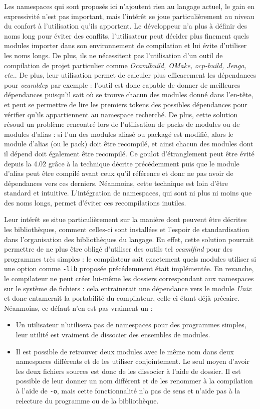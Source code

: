\documentclass[11pt,a4paper]{report}
\begin{document}
Les namespaces qui sont proposés ici n'ajoutent rien au langage actuel, le gain
en expressivité n'est pas important, mais l'intérêt se joue particulièrement au
niveau du confort à l'utilisation qu'ils apportent. Le développeur n'a plus à
définir des noms long pour éviter des conflits, l'utilisateur peut décider plus
finement quels modules importer dans son environnement de compilation et lui
évite d'utiliser les noms longs. De plus, ils ne nécessitent pas l'utilisation
d'un outil de compilation de projet particulier comme \emph{Ocamlbuild, OMake,
  ocp-build, Jenga, etc.}. De plus, leur utilisation permet de calculer plus
efficacement les dépendances pour \emph{ocamldep} par exemple : l'outil est donc
capable de donner de meilleures dépendances puisqu'il sait où se trouve chacun
des modules donné dans l'en-tête, et peut se permettre de lire les premiers
tokens des possibles dépendances pour vérifier qu'ils appartiennent au namespace
recherché. De plus, cette solution résoud un problème rencontré lors de
l'utilisation de packs de modules ou de modules d'alias : si l'un des modules
aliasé ou packagé est modifié, alors le module d'alias (ou le pack) doit être
recompilé, et ainsi chacun des modules dont il dépend doit également être
recompilé. Ce goulot d'étranglement peut être évité depuis la 4.02 grâce à la
technique décrite précédemment puis que le module d'alias peut être compilé
avant ceux qu'il référence et donc ne pas avoir de dépendances vers ces
derniers. Néanmoins, cette technique est loin d'être standard et
intuitive. L'intégration de namespaces, qui sont ni plus ni moins que des noms
longs, permet d'éviter ces recompilations inutiles.

Leur intérêt se situe particulièrement sur la manière dont peuvent être décrites
les bibliothèques, comment celles-ci sont installées et l'espoir de
standardisation dans l'organisation des bibliothèques du langage. En effet,
cette solution pourrait permettre de ne plus être obligé d'utiliser des outils
tel \emph{ocamlfind} pour des programmes très simples : le compilateur sait
exactement quels modules utiliser si une option comme \texttt{-lib} proposée
précédemment était implémentée. En revanche, le compilateur ne peut créer
lui-même les dossiers correspondant aux namespaces sur le système de fichiers :
cela entrainerait une dépendance vers le module \emph{Unix} et donc entamerait
la portabilité du compilateur, celle-ci étant déjà précaire. Néanmoins, ce
défaut n'en est pas vraiment un :
\begin{itemize}
\item Un utilisateur n'utilisera pas de namespaces pour des programmes simples,
  leur utilité est vraiment de dissocier des ensembles de modules.
\item Il est possible de retrouver deux modules avec le même nom dans deux
  namespaces différents et de les utiliser conjointement. Le seul moyen d'avoir
  les deux fichiers sources est donc de les dissocier à l'aide de dossier. Il
  est possible de leur donner un nom différent et de les renommer à la
  compilation à l'aide de \texttt{-o}, mais cette fonctionnalité n'a pas de sens
  et n'aide pas à la relecture du programme ou de la bibliothèque.
\end{itemize}
\end{document}
